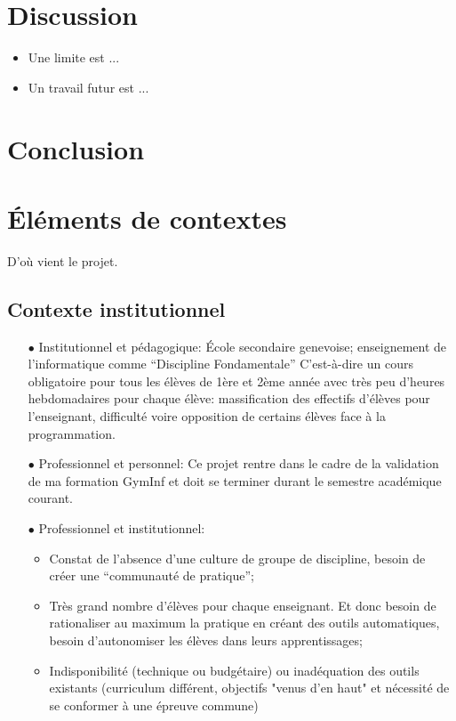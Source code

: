 \documentclass[11pt,a4paper]{article}
\begin{document}
\section{Discussion}
\begin{itemize}
    \item Une limite est ...
    \item Un travail futur est ...
\end{itemize}

\section{Conclusion}





\section{Éléments de contextes}
D'où vient le projet.

\subsection{Contexte institutionnel}
\begin{itemize}
    \item[$\bullet$ Institutionnel et pédagogique:] École secondaire genevoise; enseignement de l'informatique comme “Discipline Fondamentale” C'est-à-dire un cours obligatoire pour tous les élèves de 1ère et 2ème année avec très peu d’heures hebdomadaires pour chaque élève: massification des effectifs d’élèves pour l’enseignant, difficulté voire opposition de certains élèves face à la programmation.
    \item[$\bullet$ Professionnel et personnel:] Ce projet rentre dans le cadre de la validation de ma formation GymInf et doit se terminer durant le semestre académique courant.
    \item[$\bullet$ Professionnel et institutionnel:] 
        \begin{itemize}
        \item Constat de l'absence d’une culture de groupe de discipline, besoin de créer une “communauté de pratique”; 
        \item Très grand nombre d'élèves pour chaque enseignant. Et donc besoin de rationaliser au maximum la pratique en créant des outils automatiques, besoin d’autonomiser les élèves dans leurs apprentissages; 
        \item Indisponibilité (technique ou budgétaire) ou inadéquation des outils existants (curriculum différent, objectifs "venus d'en haut" et nécessité de se conformer à une épreuve commune)
        \end{itemize}
\end{itemize}
\end{document}
